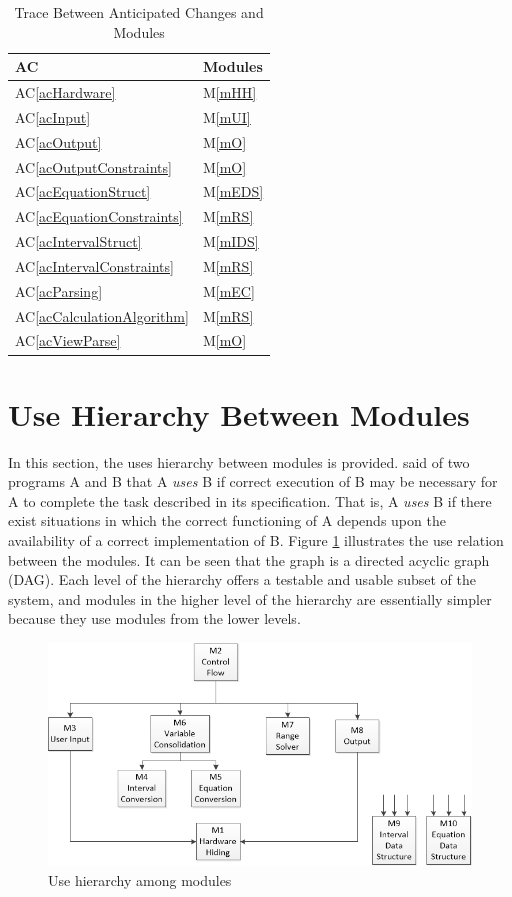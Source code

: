 \documentclass[12pt, titlepage]{article}
\newcommand{\acref}[1]{AC\ref{#1}}
\newcommand{\mref}[1]{M\ref{#1}}
\begin{document}
\begin{table}[H]
\centering
\begin{tabular}{p{} p{}}
\toprule
\textbf{AC} & \textbf{Modules}\\
\midrule
\acref{acHardware} & \mref{mHH}\\
\acref{acInput} & \mref{mUI}\\
\acref{acOutput} & \mref{mO}\\
\acref{acOutputConstraints} & \mref{mO}\\
\acref{acEquationStruct} & \mref{mEDS}\\
\acref{acEquationConstraints} & \mref{mRS}\\
\acref{acIntervalStruct} & \mref{mIDS}\\
\acref{acIntervalConstraints} & \mref{mRS}\\
\acref{acParsing} & \mref{mEC}\\
\acref{acCalculationAlgorithm} & \mref{mRS}\\
\acref{acViewParse} & \mref{mO}\\
\bottomrule
\end{tabular}
\caption{Trace Between Anticipated Changes and Modules}
\label{TblACT}
\end{table}

\section{Use Hierarchy Between Modules} \label{SecUse}

In this section, the uses hierarchy between modules is
provided. \citet{Parnas1978} said of two programs A and B that A {\em uses} B if
correct execution of B may be necessary for A to complete the task described in
its specification. That is, A {\em uses} B if there exist situations in which
the correct functioning of A depends upon the availability of a correct
implementation of B.  Figure \ref{FigUH} illustrates the use relation between
the modules. It can be seen that the graph is a directed acyclic graph
(DAG). Each level of the hierarchy offers a testable and usable subset of the
system, and modules in the higher level of the hierarchy are essentially simpler
because they use modules from the lower levels.

\begin{figure}[H]
\centering
\includegraphics[width=\textwidth]{figures/ModuleGraph.png}
\caption{Use hierarchy among modules}
\label{FigUH}
\end{figure}
\end{document}
